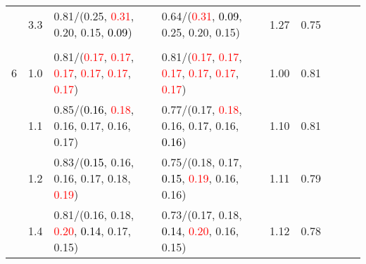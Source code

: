 \documentclass[10pt,a4paper]{report}
\begin{document}
\begin{table}[!htbp]
\begin{center}
{\begin{tabular}{ccllccccc}
				  & 3.3                               & 0.81/(0.25, \textcolor{red}{0.31}, 0.20, 0.15, \textcolor{black}{0.09})                                                                                                                       & 0.64/(\textcolor{red}{0.31}, \textcolor{black}{0.09}, 0.25, 0.20, 0.15)                                                                                                                       & 1.27             & 0.75                     \\
				  &                                   &                                                                                                                                                                                               &                                                                                                                                                                                               &                                             \\
				6 & 1.0                               & 0.81/(\textcolor{red}{0.17}, \textcolor{red}{0.17}, \textcolor{red}{0.17}, \textcolor{red}{0.17}, \textcolor{red}{0.17}, \textcolor{red}{0.17})                                               & 0.81/(\textcolor{red}{0.17}, \textcolor{red}{0.17}, \textcolor{red}{0.17}, \textcolor{red}{0.17}, \textcolor{red}{0.17}, \textcolor{red}{0.17})                                               & 1.00             & 0.81                     \\
				  & 1.1                               & 0.85/(\textcolor{black}{0.16}, \textcolor{red}{0.18}, 0.16, 0.17, 0.16, 0.17)                                                                                                                 & 0.77/(0.17, \textcolor{red}{0.18}, 0.16, 0.17, 0.16, \textcolor{black}{0.16})                                                                                                                 & 1.10             & 0.81                     \\
				  & 1.2                               & 0.83/(\textcolor{black}{0.15}, 0.16, 0.16, 0.17, 0.18, \textcolor{red}{0.19})                                                                                                                 & 0.75/(0.18, 0.17, \textcolor{black}{0.15}, \textcolor{red}{0.19}, 0.16, 0.16)                                                                                                                 & 1.11             & 0.79                     \\
				  & 1.4                               & 0.81/(0.16, 0.18, \textcolor{red}{0.20}, \textcolor{black}{0.14}, 0.17, 0.15)                                                                                                                 & 0.73/(0.17, 0.18, \textcolor{black}{0.14}, \textcolor{red}{0.20}, 0.16, 0.15)                                                                                                                 & 1.12             & 0.78                     \\

\end{tabular}}
\end{center}
\end{table}
\end{document}
